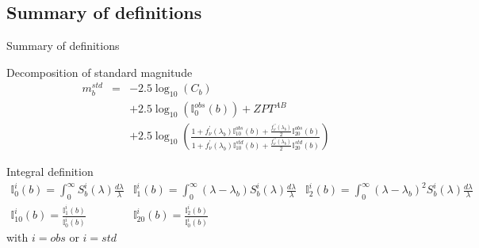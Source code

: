 \documentclass{beamer}
\begin{document}
\subsection{Summary of definitions}
\begin{frame}{Summary of definitions}
\begin{alertblock}{Decomposition of standard magnitude}
\begin{eqnarray}
m_b^{std} & = & -2.5 \log_{10}(C_b)  \nonumber \\
          &   &  + 2.5 \log_{10}(\mathbb{I}_0^{obs}(b)) + ZPT^{AB}  \nonumber \\
          &   &  + 2.5 \log_{10}\left( 
\frac{1 + f_\nu^\prime(\lambda_b)\mathbb{I}^{obs}_{10}(b)  +\frac{f_\nu^{\prime\prime}(\lambda_b)}{2}\mathbb{I}_{20}^{obs}(b)}
{1 + f_\nu^\prime(\lambda_b)\mathbb{I}^{std}_{10}(b)  +\frac{f_\nu^{\prime\prime}(\lambda_b)}{2}\mathbb{I}_{20}^{std}(b)}\right)
\end{eqnarray}
\end{alertblock}

\begin{block}{Integral definition}
{\footnotesize
$
\begin{array}{lll}
\mathbb{I}_0^i(b) = \int_0^{\infty} S_b^i(\lambda) \frac{d\lambda}{\lambda}
& \mathbb{I}_1^i(b) = \int_0^{\infty} (\lambda-\lambda_b) S_b^i(\lambda) \frac{d\lambda}{\lambda}
& \mathbb{I}_2^i(b) = \int_0^{\infty} (\lambda-\lambda_b)^2 S_b^i(\lambda) \frac{d\lambda}{\lambda} \\
\mathbb{I}^i_{10}(b) = \frac{\mathbb{I}^i_1(b)}{\mathbb{I}^i_0(b)} &
\mathbb{I}^i_{20}(b) = \frac{\mathbb{I}^i_2(b)}{\mathbb{I}^i_0(b)} & 
\end{array}
$
}
with $i=obs$ or $i=std$
\end{block}
\end{frame}
\end{document}

